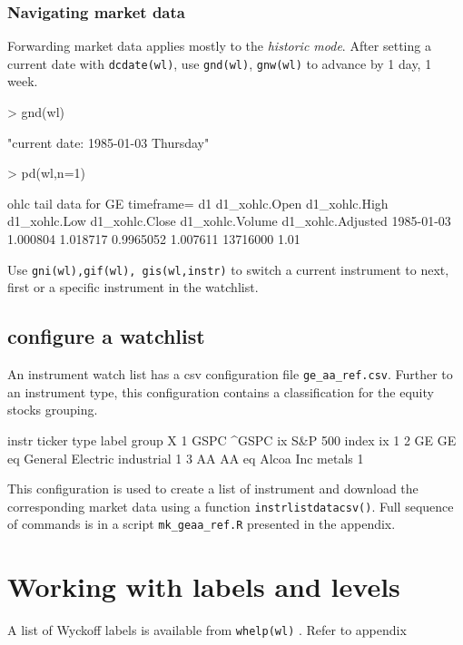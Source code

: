 \documentclass{article}
\begin{document}
\subsubsection{Navigating market data}
Forwarding market data applies mostly to the {\sl historic mode}. After setting a current date with {\tt dcdate(wl)}, use {\tt gnd(wl)}, {\tt gnw(wl)} to advance by 1 day, 1 week.
\begin{Schunk}
\begin{Sinput}
> gnd(wl)
\end{Sinput}
\begin{Soutput}
[1] "current date: 1985-01-03 Thursday"
\end{Soutput}
\begin{Sinput}
> pd(wl,n=1)
\end{Sinput}
\begin{Soutput}
ohlc tail data for GE timeframe= d1 
           d1_xohlc.Open d1_xohlc.High d1_xohlc.Low d1_xohlc.Close d1_xohlc.Volume d1_xohlc.Adjusted
1985-01-03      1.000804      1.018717    0.9965052       1.007611        13716000              1.01
\end{Soutput}
\end{Schunk}
Use {\tt gni(wl),gif(wl), gis(wl,instr)} to switch a current instrument to next, first or a specific instrument in the watchlist.

\subsection{configure a watchlist}
An instrument watch list has a csv configuration file \texttt{ge\_aa\_ref.csv}. Further to an instrument type, this configuration contains a classification for the equity stocks grouping.
\begin{Schunk}
\begin{Soutput}
  instr ticker type            label      group X
1  GSPC  ^GSPC   ix    S&P 500 index         ix 1
2    GE     GE   eq General Electric industrial 1
3    AA     AA   eq        Alcoa Inc     metals 1
\end{Soutput}
\end{Schunk}
This configuration is used to create a list of instrument and download  the corresponding market data
using a function {\tt instrlistdatacsv()}. Full sequence of commands  is in a script \texttt{mk\_geaa\_ref.R} presented in the appendix.

\section{Working with labels and levels}
A list of Wyckoff labels is available from {\tt whelp(wl)} \cite{wyckoffinst}. Refer to appendix
\end{document}
